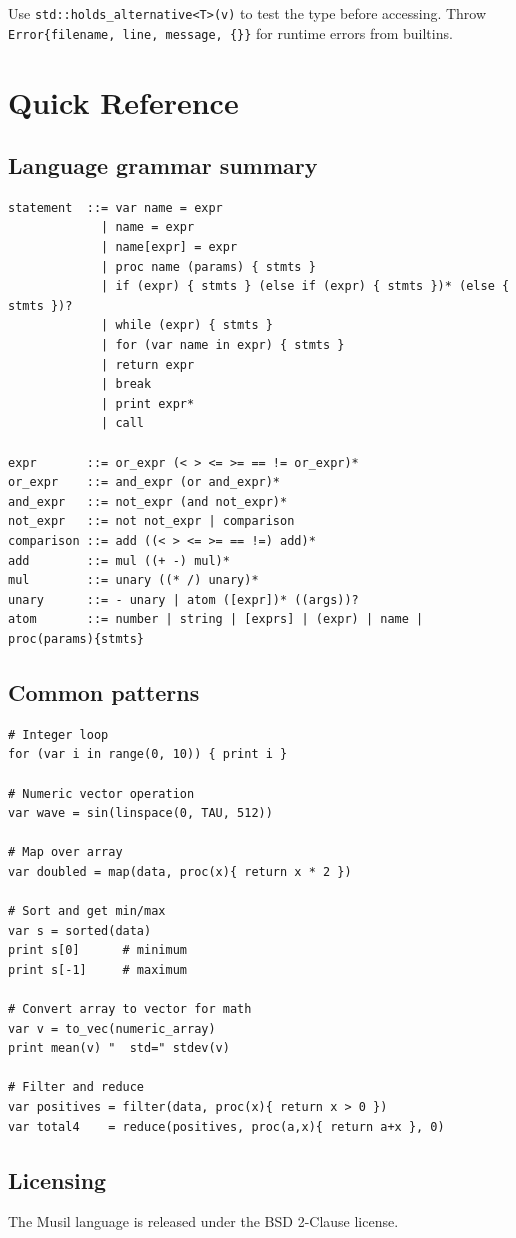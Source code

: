 \documentclass[11pt,a4paper]{article}
\begin{document}
Use \texttt{std::holds\_alternative<T>(v)} to test the type before accessing.
Throw \texttt{Error\{filename, line, message, \{\}\}} for runtime errors from
builtins.

\section{Quick Reference}
\label{sec:quickref}

\subsection*{Language grammar summary}

\begin{lstlisting}[numbers=none]
statement  ::= var name = expr
             | name = expr
             | name[expr] = expr
             | proc name (params) { stmts }
             | if (expr) { stmts } (else if (expr) { stmts })* (else { stmts })?
             | while (expr) { stmts }
             | for (var name in expr) { stmts }
             | return expr
             | break
             | print expr*
             | call

expr       ::= or_expr (< > <= >= == != or_expr)*
or_expr    ::= and_expr (or and_expr)*
and_expr   ::= not_expr (and not_expr)*
not_expr   ::= not not_expr | comparison
comparison ::= add ((< > <= >= == !=) add)*
add        ::= mul ((+ -) mul)*
mul        ::= unary ((* /) unary)*
unary      ::= - unary | atom ([expr])* ((args))?
atom       ::= number | string | [exprs] | (expr) | name | proc(params){stmts}
\end{lstlisting}

\subsection*{Common patterns}

\begin{lstlisting}
# Integer loop
for (var i in range(0, 10)) { print i }

# Numeric vector operation
var wave = sin(linspace(0, TAU, 512))

# Map over array
var doubled = map(data, proc(x){ return x * 2 })

# Sort and get min/max
var s = sorted(data)
print s[0]      # minimum
print s[-1]     # maximum

# Convert array to vector for math
var v = to_vec(numeric_array)
print mean(v) "  std=" stdev(v)

# Filter and reduce
var positives = filter(data, proc(x){ return x > 0 })
var total4    = reduce(positives, proc(a,x){ return a+x }, 0)
\end{lstlisting}

\subsection*{Licensing}

The Musil language is released under the BSD 2-Clause license.
\end{document}
